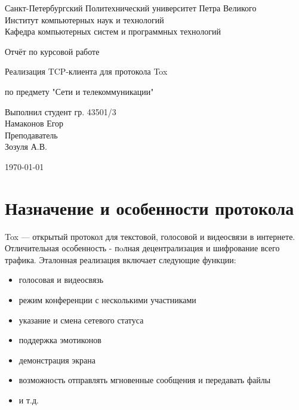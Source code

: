 \documentclass{/home/fresheed/utils/latex/university-templates/lab-report}
\begin{document}

\begin{titlepage}
  \centering
  \large Санкт-Петербургский Политехнический университет Петра Великого\\
  \large Институт компьютерных наук и технологий \\
  \large Кафедра компьютерных систем и программных технологий\\

  \vfill

  \Large Отчёт по курсовой работе

  \vspace{0.5cm} 

  \LARGE Реализация TCP-клиента для протокола Tox

  \vspace{0.5cm}

  \Large по предмету "Сети и телекоммуникации"

  \vspace{0.5cm} 

  \vfill
  \begin{flushright}
    Выполнил студент гр. 43501/3 \\
    Намаконов Егор \\
    Преподаватель \\
    Зозуля А.В. \\
  \end{flushright}
  \vfill

  \large \today\par
\end{titlepage}

\tableofcontents

\section{Назначение и особенности протокола}

Tox — открытый протокол для текстовой, голосовой и видеосвязи в интернете. Отличительная особенность - пoлная децентрализация и шифрование всего трафика. Эталонная реализация включает следующие функции:
\begin{itemize}
\item голосовая и видеосвязь
\item режим конференции с несколькими участниками
\item указание и смена сетевого статуса
\item поддержка эмотиконов
\item демонстрация экрана
\item возможность отправлять мгновенные сообщения и передавать файлы
\item и т.д.
\end{itemize}
\end{document}

